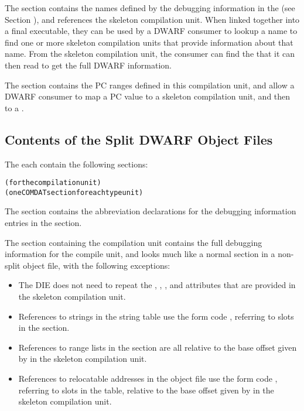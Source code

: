 The \dotdebugnames{}
section contains the names defined by the debugging
information in the \splitDWARFobjectfile{} 
(see Section ), 
and references the skeleton compilation unit. 
When linked together into a final executable,
they can be used by a DWARF consumer to lookup a name to find one
or more skeleton compilation units that provide information about
that name. From the skeleton compilation unit, the consumer can
find the \splitDWARFobjectfile{} that it can then read to get the full
DWARF information.

The \dotdebugaranges{} section contains the PC ranges defined in this
compilation unit, and allow a DWARF consumer to map a PC value to
a skeleton compilation unit, and then to a \splitDWARFobjectfile.


\subsection{Contents of the Split DWARF Object Files}
The  each contain the following sections:
\begin{alltt}
  \dotdebugabbrevdwo
  \dotdebuginfodwo{} (for the compilation unit)
  \dotdebuginfodwo{} (one COMDAT section for each type unit)
  \dotdebuglocdwo
  \dotdebuglinedwo
  \dotdebugmacrodwo
  \dotdebugstroffsetsdwo
  \dotdebugstrdwo
\end{alltt}
The \dotdebugabbrevdwo{} section contains the abbreviation
declarations for the debugging information entries in the
\dotdebuginfodwo{} section. 

The \dotdebuginfodwo{} section containing the compilation unit
contains the full debugging information for the compile unit, and
looks much like a normal \dotdebuginfo{} section in a non-split
object file, with the following exceptions:
\begin{itemize}
\item The \DWTAGcompileunit{} DIE does not need to repeat the
\DWATranges, \DWATlowpc, \DWAThighpc, and
\DWATstmtlist{} attributes that are provided in the skeleton
compilation unit.

\item References to strings in the string table use the 
form code \DWFORMstrx, referring to slots in the
\dotdebugstroffsetsdwo{} section.

\item References to range lists in the \dotdebugranges{} section are
all relative to the base offset given by \DWATrangesbase{}
in the skeleton compilation unit.

\item References to relocatable addresses in the object file 
use the form code \DWFORMaddrx, referring to slots in the
\dotdebugaddr{} table, relative to the base offset given by
\DWATaddrbase{} in the skeleton compilation unit.
\end{itemize}

